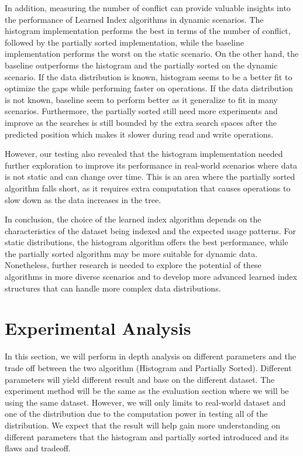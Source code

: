 \documentclass[11pt,a4paper]{article}
\newcommand{\learnindex}{\textsf{Learned Index}\xspace}
\newcommand{\conflict}{\textsf{conflict}\xspace}
\begin{document}
In addition, measuring the number of \conflict can provide valuable insights into the performance of \learnindex algorithms in dynamic scenarios. The histogram implementation performs the best in terms of the number of \conflict, followed by the partially sorted implementation, while the baseline implementation performs the worst on the static scenario. On the other hand, the baseline outperforms the histogram and the partially sorted on the dynamic scenario. If the data distribution is known, histogram seems to be a better fit to optimize the gaps while performing faster on operations. If the data distribution is not known, baseline seem to perform better as it generalize to fit in many scenarios. Furthermore, the partially sorted still need more experiments and improve as the searches is still bounded by the extra search spaces after the predicted position which makes it slower during read and write operations.

However, our testing also revealed that the histogram implementation needed further exploration to improve its performance in real-world scenarios where data is not static and can change over time. This is an area where the partially sorted algorithm falls short, as it requires extra computation that causes operations to slow down as the data increases in the tree.

In conclusion, the choice of the learned index algorithm depends on the characteristics of the dataset being indexed and the expected usage patterns. For static distributions, the histogram algorithm offers the best performance, while the partially sorted algorithm may be more suitable for dynamic data. Nonetheless, further research is needed to explore the potential of these algorithms in more diverse scenarios and to develop more advanced learned index structures that can handle more complex data distributions.

\section{Experimental Analysis}
In this section, we will perform in depth analysis on different parameters and the trade off between the two algorithm (Histogram and Partially Sorted). Different parameters will yield different result and base on the different dataset. The experiment method will be the same as the evaluation section where we will be using the same dataset. However, we will only limits to real-world dataset and one of the distribution due to the computation power in testing all of the distribution. We expect that the result will help gain more understanding on different parameters that the histogram and partially sorted introduced and its flaws and tradeoff.
\end{document}
